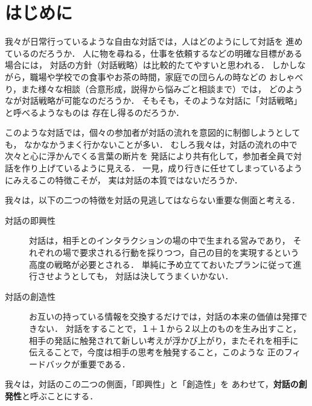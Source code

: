 

\maketitle


\section{はじめに}

我々が日常行っているような自由な対話では，人はどのようにして対話を
進めているのだろうか．
人に物を尋ねる，仕事を依頼するなどの明確な目標がある場合には，
対話の方針（対話戦略）は比較的たてやすいと思われる．
しかしながら，職場や学校での食事やお茶の時間，家庭での団らんの時などの
おしゃべり，また様々な相談（合意形成，説得から悩みごと相談まで）では，
どのようなが対話戦略が可能なのだろうか．
そもそも，そのような対話に「対話戦略」と呼べるようなものは
存在し得るのだろうか．

このような対話では，個々の参加者が対話の流れを意図的に制御しようとしても，
なかなかうまく行かないことが多い．
むしろ我々は，対話の流れの中で次々と心に浮かんでくる言葉の断片を
発話により共有化して，参加者全員で対話を作り上げているように見える．
一見，成り行きに任せてしまっているようにみえるこの特徴こそが，
実は対話の本質ではないだろうか．

我々は，以下の二つの特徴を対話の見逃してはならない重要な側面と考える．

\begin{description}

\item[対話の即興性]
対話は，相手とのインタラクションの場の中で生まれる営みであり，
それぞれの場で要求される行動を採りつつ，自己の目的を実現するという
高度の戦略が必要とされる．
単純に予め立てておいたプランに従って進行させようとしても，
対話は決してうまくいかない．

\item[対話の創造性]
お互いの持っている情報を交換するだけでは，対話の本来の価値は発揮できない．
対話をすることで，１＋１から２以上のものを生み出すこと，
相手の発話に触発されて新しい考えが浮かび上がり，またそれを相手に
伝えることで，今度は相手の思考を触発すること，このような
正のフィードバックが重要である．

\end{description}

\hspace*{-0.5cm}我々は，対話のこの二つの側面，「即興性」と「創造性」を
あわせて，{\bf 対話の創発性}と呼ぶことにする．

